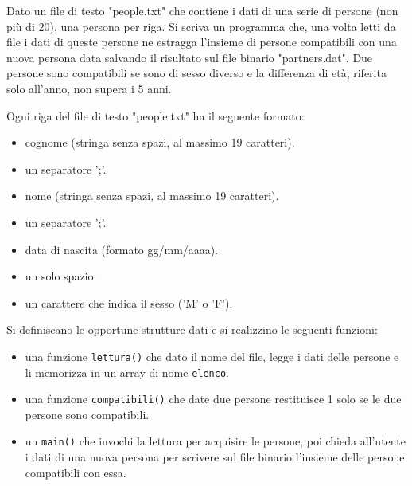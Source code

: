 \begin{Exercise}[label={ex:lettura_scrittura}]
    Dato un file di testo "people.txt" che contiene i dati di una serie di persone (non più di 20),
    una persona per riga.
    Si scriva un programma che, una volta letti da file i dati di queste persone ne estragga l'insieme di persone
    compatibili con una nuova persona data salvando il risultato sul file binario "partners.dat".
    Due persone sono compatibili se sono di sesso diverso e la differenza di età, riferita solo all'anno, non supera i 5 anni.

    Ogni riga del file di testo "people.txt" ha il seguente formato:
    \begin{itemize}
        \item cognome (stringa senza spazi, al massimo 19 caratteri).
        \item un separatore ';'.
        \item nome (stringa senza spazi, al massimo 19 caratteri).
        \item un separatore ';'.
        \item data di nascita (formato gg/mm/aaaa).
        \item un solo spazio.
        \item un carattere che indica il sesso ('M' o 'F').
    \end{itemize}

    Si definiscano le opportune strutture dati e si realizzino le seguenti funzioni:
    \begin{itemize}
        \item una funzione \texttt{lettura()} che dato il nome del file, legge i dati delle persone
        e li memorizza in un array di nome \texttt{elenco}.
        \item una funzione \texttt{compatibili()} che date due persone restituisce 1 solo se le due persone sono
        compatibili.
        \item un \texttt{main()} che invochi la lettura per acquisire le persone, poi chieda all'utente i dati
        di una nuova persona per scrivere sul file binario l'insieme delle persone compatibili con essa.
    \end{itemize}
\end{Exercise}

\begin{Answer}[ref={ex:lettura_scrittura}]
  	
\end{Answer}